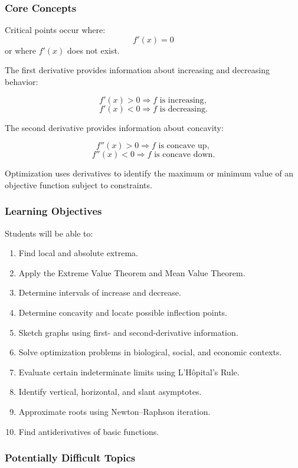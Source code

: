\documentclass[11pt]{article}
\begin{document}
\subsubsection*{Core Concepts}

Critical points occur where:
\[
f'(x)=0
\]
or where \(f'(x)\) does not exist.

The first derivative provides information about increasing and decreasing behavior:

\[
f'(x)>0 \Rightarrow f \text{ is increasing},
\]
\[
f'(x)<0 \Rightarrow f \text{ is decreasing}.
\]

The second derivative provides information about concavity:

\[
f''(x)>0 \Rightarrow f \text{ is concave up},
\]
\[
f''(x)<0 \Rightarrow f \text{ is concave down}.
\]

Optimization uses derivatives to identify the maximum or minimum value of an objective function subject to constraints.

\subsubsection*{Learning Objectives}

Students will be able to:

\begin{enumerate}[label=\arabic*.]
    \item Find local and absolute extrema.
    \item Apply the Extreme Value Theorem and Mean Value Theorem.
    \item Determine intervals of increase and decrease.
    \item Determine concavity and locate possible inflection points.
    \item Sketch graphs using first- and second-derivative information.
    \item Solve optimization problems in biological, social, and economic contexts.
    \item Evaluate certain indeterminate limits using L'H\^{o}pital's Rule.
    \item Identify vertical, horizontal, and slant asymptotes.
    \item Approximate roots using Newton--Raphson iteration.
    \item Find antiderivatives of basic functions.
\end{enumerate}

\subsubsection*{Potentially Difficult Topics}
\end{document}
